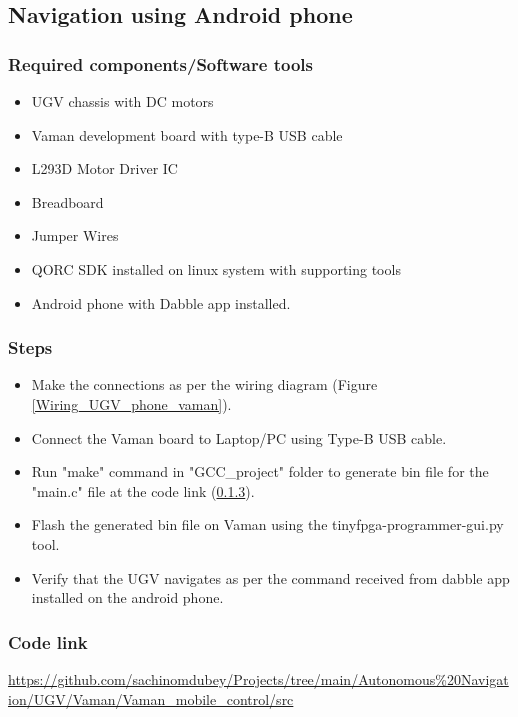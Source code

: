 \subsection{Navigation using Android phone} 
\subsubsection{Required components/Software tools}
\begin{itemize}
    \item  UGV chassis with DC motors
    \item  Vaman development board with type-B USB cable
    \item  L293D Motor Driver IC
    \item  Breadboard
    \item  Jumper Wires
    \item  QORC SDK installed on linux system with supporting tools
    \item  Android phone with Dabble app installed.
\end{itemize}



\subsubsection{Steps}
\begin{itemize}
    \item Make the connections as per the wiring diagram (Figure \ref{Wiring_UGV_phone_vaman}).
    \item Connect the Vaman board to Laptop/PC using Type-B USB cable.
    \item Run "make" command in "GCC\_project" folder to generate bin file for the "main.c" file at the code link (\ref{Code_link_UGV_phone_vaman}).
    \item Flash the generated bin file on Vaman using the tinyfpga-programmer-gui.py tool. 
    \item Verify that the UGV navigates as per the command received from dabble app installed on the android phone.
\end{itemize}

\subsubsection{{Code link}}\label{Code_link_UGV_phone_vaman}
\begin{tcolorbox}
\url{https://github.com/sachinomdubey/Projects/tree/main/Autonomous\%20Navigation/UGV/Vaman/Vaman_mobile_control/src}
\end{tcolorbox}

